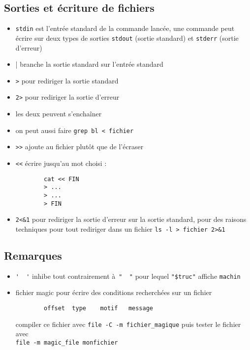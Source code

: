 \subsection{Sorties et écriture de fichiers}
\begin{itemize}
    \item \verb|stdin| est l'entrée standard de la commande lancée, une commande peut écrire sur deux types de sorties \verb|stdout| (sortie standard) et \verb|stderr| (sortie d'erreur)
    \item \verb||| branche la sortie standard sur l'entrée standard
    \item \verb|>| pour rediriger la sortie standard
    \item \verb|2>| pour rediriger la sortie d'erreur
    \item les deux peuvent s'enchaîner
    \item on peut aussi faire \verb|grep bl < fichier|
    \item \verb|>>| ajoute au fichier plutôt que de l'écraser
    \item \verb|<<| écrire jusqu'au mot choisi :
        \begin{verbatim}
        cat << FIN
        > ...
        > ...
        > FIN
        \end{verbatim}
    \item \verb|2<&1| pour rediriger la sortie d'erreur sur la sortie standard, pour des raisons techniques pour tout rediriger dans un fichier \verb|ls -l > fichier 2>&1|
\end{itemize}

\subsection{Remarques}
\begin{itemize}
    \item \verb|'  '| inhibe tout contrairement à \verb|"  "| pour lequel \verb|"$truc"| affiche \verb|machin|
    \item fichier magic pour écrire des conditions recherchées sur un fichier
        \begin{verbatim}
        offset  type    motif   message
        \end{verbatim}
        compiler ce fichier avec \verb|file -C -m fichier_magique| puis tester le fichier avec
        \\ \verb|file -m magic_file monfichier|
\end{itemize}
